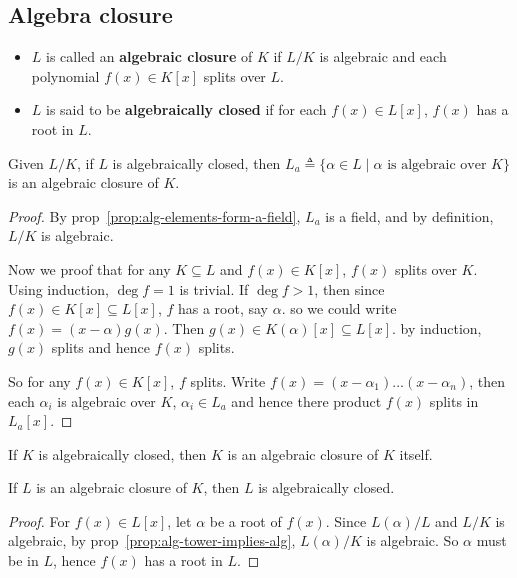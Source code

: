 \subsection{Algebra closure}

\begin{definition} \hfill
  \begin{itemize}
    \item $L$ is called an {\bf algebraic closure} of $K$ if $L/K$ is algebraic and
      each polynomial $f(x) \in K[x]$ splits over $L$.
    \item $L$ is said to be {\bf algebraically closed} if for each $f(x) \in L[x]$,
      $f(x)$ has a root in $L$.
  \end{itemize}
\end{definition}

\begin{prop}
  Given $L/K$, if $L$ is algebraically closed, then $L_a \triangleq \{ \alpha \in L \mid
  \alpha \text{ is algebraic over } K \}$ is an algebraic closure of $K$.

  \begin{proof}
    By prop~\ref{prop:alg-elements-form-a-field}, $L_a$ is a field, and by definition,
    $L/K$ is algebraic.

    Now we proof that for any $K \subseteq L$ and $f(x) \in K[x]$, $f(x)$ splits over $K$.
    Using induction, $\deg f = 1$ is trivial.
    If $\deg f > 1$, then since $f(x) \in K[x] \subseteq L[x]$,
    $f$ has a root, say $\alpha$. so we could write $f(x) = (x - \alpha) g(x)$.
    Then $g(x) \in K(\alpha)[x] \subseteq L[x]$. by induction, $g(x)$ splits and hence
    $f(x)$ splits.

    So for any $f(x) \in K[x]$, $f$ splits. Write $f(x) = (x - \alpha_1) \dots (x - \alpha_n)$,
    then each $\alpha_i$ is algebraic over $K$, $\alpha_i \in L_a$ and hence there product $f(x)$
    splits in $L_a[x]$.
  \end{proof}
\end{prop}

\begin{coro}
  If $K$ is algebraically closed, then $K$ is an algebraic closure of $K$ itself.
\end{coro}

\begin{prop}
  If $L$ is an algebraic closure of $K$, then $L$ is algebraically closed.

  \begin{proof}
    For $f(x) \in L[x]$, let $\alpha$ be a root of $f(x)$. Since $L(\alpha)/L$ and
    $L/K$ is algebraic, by prop~\ref{prop:alg-tower-implies-alg}, $L(\alpha)/K$ is algebraic.
    So $\alpha$ must be in $L$, hence $f(x)$ has a root in $L$.
  \end{proof}
\end{prop}

